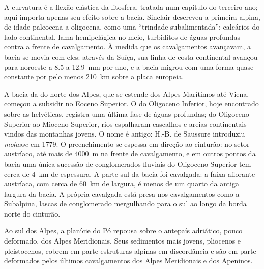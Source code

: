 A curvatura é a flexão elástica da litosfera, tratada num capítulo do terceiro
ano; aqui importa apenas seu efeito sobre a bacia. Sinclair descreveu a primeira  alpina, de idade paleocena a oligocena,
como uma ``trindade subalimentada'': calcários do lado continental, lama hemipelágica no
meio, turbiditos de águas profundas contra a frente de cavalgamento. À medida que os cavalgamentos avançavam, a bacia
se movia com eles: através da Suíça, sua linha de costa continental avançou para noroeste a 8.5
a \qty{12.9}{mm} por ano, e a bacia migrou com uma forma quase constante por pelo menos
\qty{210}{km} sobre a placa europeia.

A bacia da  do norte dos Alpes, que se estende dos Alpes Marítimos até Viena, começou a
subsidir no Eoceno Superior. O  do Oligoceno Inferior, hoje encontrado sobre as 
helvéticas, registra uma última fase de águas profundas; do Oligoceno Superior ao Mioceno Superior, rios
espalharam cascalhos e areias continentais vindos das montanhas jovens. O nome é antigo: H.-B. de Saussure
introduziu \emph{molasse} em 1779. O preenchimento se espessa em direção ao cinturão: no
setor austríaco, até mais de \qty{4000}{m} na frente de cavalgamento, e em outros pontos da bacia
uma única sucessão de conglomerados fluviais do Oligoceno Superior tem cerca de \qty{4}{km} de espessura. A parte sul
da bacia foi cavalgada: a faixa aflorante austríaca, com cerca de \qty{60}{km} de largura, é menos
de um quarto da antiga largura da bacia. A própria  cavalgada está presa
nos cavalgamentos como a  Subalpina, lascas de conglomerado mergulhando para o sul ao longo da
borda norte do cinturão.

Ao sul dos Alpes, a planície do Pó repousa sobre o antepaís adriático, pouco deformado, dos
Alpes Meridionais. Seus sedimentos mais jovens, pliocenos e pleistocenos, cobrem em parte estruturas
alpinas em discordância e são em parte deformados pelos últimos cavalgamentos dos Alpes Meridionais
e dos Apeninos.

